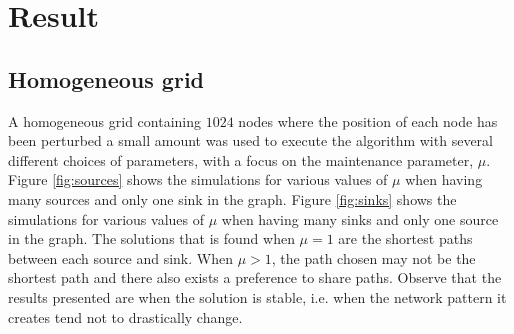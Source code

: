 \section{Result}
\label{sec:result}

\subsection{Homogeneous grid}
A homogeneous grid containing $1024$ nodes where the position of each node has been perturbed a small amount was used to execute the algorithm with several different choices of parameters, with a focus on the maintenance parameter, $\mu$. Figure \ref{fig:sources} shows the simulations for various values of $\mu$ when having many sources and only one sink in the graph. Figure \ref{fig:sinks} shows the simulations for various values of $\mu$ when having many sinks and only one source in the graph. The solutions that is found when $\mu=1$ are the shortest paths between each source and sink. When $\mu > 1$, the path chosen may not be the shortest path and there also exists a preference to share paths. Observe that the results presented are when the solution is stable, i.e. when the network pattern it creates tend not to drastically change.

